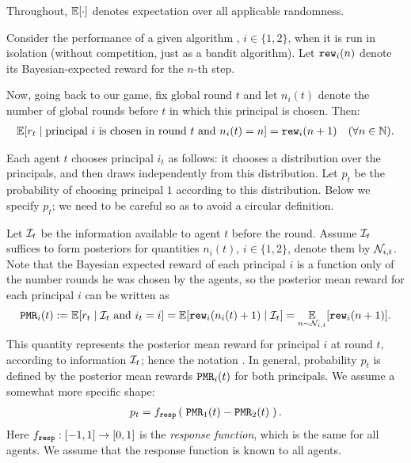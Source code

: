 Throughout, $\E[\cdot]$ denotes expectation over all applicable randomness.

Consider the performance of a given algorithm \alg[i], $i\in \{1,2\}$, when it is run in isolation (\ie without competition, just as a bandit algorithm). Let $\mathtt{rew}_i(n)$ denote its Bayesian-expected reward for the $n$-th step.

Now, going back to our game, fix global round $t$ and let $n_i(t)$ denote the number of global rounds before $t$ in which this principal is chosen. Then:
\begin{align*}
 \E[r_t \mid \text{principal $i$ is chosen in round $t$ and $n_i(t)=n$} ]
    = \rew_i(n+1) \quad (\forall n\in\N).
\end{align*}


Each agent $t$ chooses principal $i_t$ as follows: it chooses a distribution over the principals, and then draws independently from this distribution. Let $p_t$ be the probability of choosing principal $1$ according to this distribution. Below we specify $p_t$; we need to be careful so as to avoid a circular definition.


Let $\mathcal{I}_t$ be the information available to agent $t$ before the
round. Assume $\mathcal{I}_t$ suffices to form posteriors for quantities
$n_i(t)$, $i\in \{1,2\}$, denote them by $\mathcal{N}_{i,t}$. Note
that the Bayesian expected reward of each principal $i$ is a function
only of the number rounds he was chosen by the agents, so the
posterior mean reward for each principal $i$ can be written as
\begin{align*}
 \PMR_i(t) := \E[r_t \mid \text{$\mI_t$ and $i_t=i$} ]
    = \E[\rew_i(n_i(t)+1) \mid \mI_t]
    = \E_{n\sim \posteriorN{i}{t}}[\rew_i(n+1)].
\end{align*}
This quantity represents the posterior mean reward for principal $i$
at round $t$, according to information $\mathcal{I}_t$; hence the notation \PMR. In general, probability $p_t$ is defined by the
posterior mean rewards $\mathtt{PMR}_i(t)$ for both principals. We assume a
somewhat more specific shape:
\begin{align}
p_t = f_{\mathtt{resp}}\left(\; \mathtt{PMR}_1(t) - \mathtt{PMR}_2(t) \;\right).
\end{align}
Here $f_{\mathtt{resp}}:[-1,1]\to [0,1]$ is the \emph{response function}, which is the same for all agents. We assume that the response function is known to all agents.

